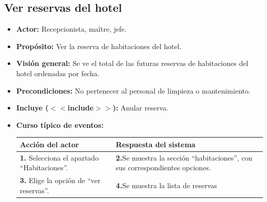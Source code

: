 \documentclass[spanish,a4paper,11pt, twoside]{report}	%
\begin{document}
	\subsection{Ver reservas del hotel}
		\begin{itemize}
			\item \textbf{Actor:} Recepcionista, maître, jefe.
			\item \textbf{Propósito:} Ver la reserva de habitaciones del hotel.
			\item \textbf{Visión general:} Se ve el total de las futuras reservas de
				habitaciones del hotel ordenadas por fecha.
			\item \textbf{Precondiciones:} No pertenecer al personal de limpieza o mantenimiento.
			\item \textbf{Incluye ($<<$include$>>$):} Anular reserva.
			\item \textbf{Curso típico de eventos:} 	\\
				\begin{tabular}{|p{6cm}||p{6cm}|}
				\hline
				\textbf{Acción del actor} & \textbf{Respuesta del sistema} \\ \hline
				\textbf{1.} Selecciona el apartado ``Habitaciones''. & 
				\textbf{2.}Se muestra la sección ``habitaciones'', con sus correspondientes opciones. \\ \hline 
				\textbf{3.} Elige la opción de ``ver reservas''. & \textbf{4.}Se muestra la lista de reservas \\ \hline
			\end{tabular}
			\\
		\end {itemize}

\end{document}

